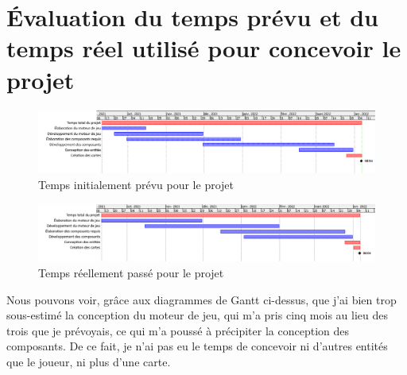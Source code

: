 \documentclass[12pt, openany]{report}
\begin{document}
\section{\'Evaluation du temps pr\'evu et du temps r\'eel utilis\'e pour concevoir le projet}
\begin{figure}[!h]
\centering
\includegraphics[scale=0.6]{ganttInit_anot.png}
\caption{Temps initialement pr\'evu pour le projet}
\end{figure}
\vspace{0.5cm}
\begin{figure}[!h]
\centering
\includegraphics[scale=0.6]{ganttFinal_anot.png}
\caption{Temps r\'eellement pass\'e pour le projet}
\end{figure}
Nous pouvons voir, gr\^ace aux diagrammes de Gantt ci-dessus, que j'ai bien trop sous-estim\'e la conception du moteur de jeu, qui m'a pris cinq mois au lieu des trois que je pr\'evoyais, ce qui m'a pouss\'e \`a pr\'ecipiter la conception des composants. De ce fait, je n'ai pas eu le temps de concevoir ni d'autres entités que le joueur, ni plus d'une carte.

\newpage
\end{document}
